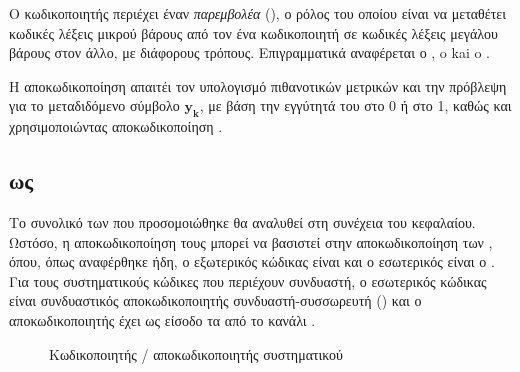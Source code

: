 Ο κωδικοποιητής  περιέχει έναν \textit{παρεμβολέα} (), ο ρόλος του οποίου είναι να μεταθέτει κωδικές λέξεις μικρού βάρους από τον ένα κωδικοποιητή σε κωδικές λέξεις μεγάλου βάρους στον άλλο, με διάφορους τρόπους. Επιγραμματικά αναφέρεται ο , o  kai o .

Η αποκωδικοποίηση απαιτέι τον υπολογισμό πιθανοτικών μετρικών  και την πρόβλεψη για το μεταδιδόμενο σύμβολο $\mathbf{y_k}$, με βάση την εγγύτητά του στο 0 ή στο 1, καθώς και χρησιμοποιώντας  αποκωδικοποίηση \cite{berrou1993near}.

\subsection{ ως }

Το συνολικό  των  που προσομοιώθηκε θα αναλυθεί στη συνέχεια του κεφαλαίου. Ωστόσο, η αποκωδικοποίηση τους μπορεί να βασιστεί στην  αποκωδικοποίηση των , όπου, όπως αναφέρθηκε ήδη, ο εξωτερικός κώδικας είναι  και ο εσωτερικός είναι ο . Για τους συστηματικούς  κώδικες που περιέχουν συνδυαστή, ο εσωτερικός κώδικας είναι συνδυαστικός αποκωδικοποιητής συνδυαστή-συσσωρευτή () και ο  αποκωδικοποιητής έχει ως είσοδο τα  από το κανάλι \cite{johnson2009iterative}.

\begin{figure}[h]
\caption{Κωδικοποιητής /  αποκωδικοποιητής συστηματικού }
\label{fig:enc/turbo dec of systematic RA}
\end{figure}

